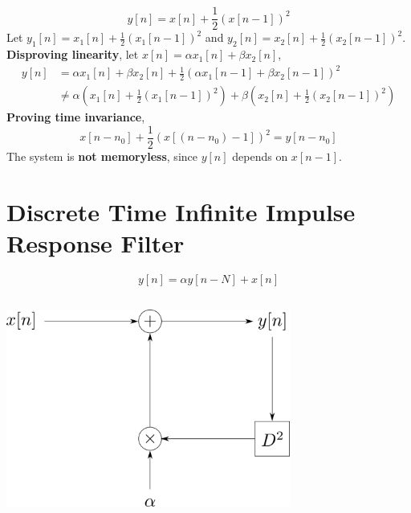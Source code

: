 \documentclass{article}
\begin{document}
\subsection{}

\begin{equation}
    y[n] = x[n] + \frac{1}{2} (x[n - 1])^2
\end{equation}
Let \(y_1[n] = x_1[n] + \frac{1}{2} (x_1[n - 1])^2\) and \(y_2[n] = x_2[n] + \frac{1}{2} (x_2[n - 1])^2\).
\textbf{Disproving linearity}, let \(x[n] = \alpha x_1[n] + \beta x_2[n]\),
\begin{align}
    y[n] &= \alpha x_1[n] + \beta x_2[n] + \frac{1}{2} (\alpha x_1[n - 1] + \beta x_2[n - 1])^2 \\
    &\neq \alpha \left(x_1[n] + \frac{1}{2} (x_1[n - 1])^2\right) + \beta \left(x_2[n] + \frac{1}{2} (x_2[n - 1])^2\right)
\end{align}
\textbf{Proving time invariance},
\begin{equation}
    x[n - n_0] + \frac{1}{2} (x[(n - n_0) - 1])^2 = y[n - n_0]
\end{equation}
The system is \textbf{not memoryless}, since \(y[n]\) depends on \(x[n - 1]\).

\section{Discrete Time Infinite Impulse Response Filter}

\begin{equation}
    y[n] = \alpha y[n - N] + x[n]
\end{equation}

\subsection{}

\begin{center}
    \includegraphics[width=0.7\textwidth]{q4-1.png}
\end{center}
\end{document}
